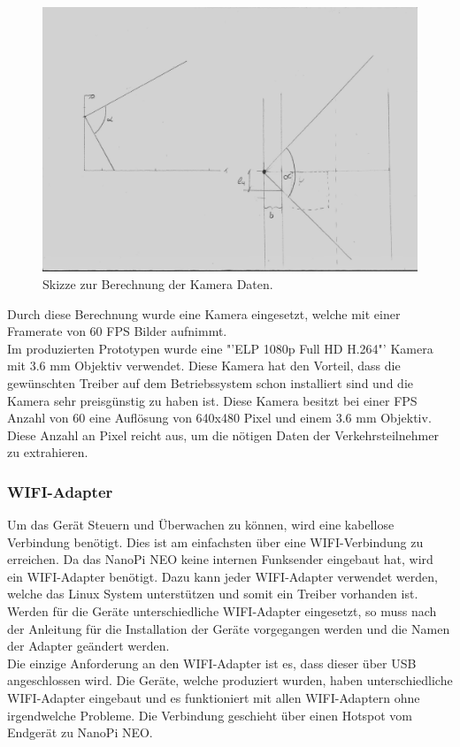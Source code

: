 \begin{figure}[H]
  \centering
  \includegraphics[height=0.49\textwidth]{Hardware/ObjektivBerechnung.jpg} 
  \caption{Skizze zur Berechnung der Kamera Daten.}
  \label{bBerechnung}
\end{figure}

Durch diese Berechnung wurde eine Kamera eingesetzt, welche mit einer Framerate von 60 FPS Bilder aufnimmt. \\
Im produzierten Prototypen wurde eine "'ELP 1080p Full HD H.264"' Kamera mit 3.6 mm Objektiv verwendet. Diese Kamera hat den Vorteil, dass die gewünschten Treiber auf dem Betriebssystem schon installiert sind und die Kamera sehr preisgünstig zu haben ist. Diese Kamera besitzt bei einer FPS Anzahl von 60 eine Auflösung von 640x480 Pixel und einem 3.6 mm Objektiv. Diese Anzahl an Pixel reicht aus, um die nötigen Daten der Verkehrsteilnehmer zu extrahieren. \cite{Kamera}

\subsubsection{WIFI-Adapter}
Um das Gerät Steuern und Überwachen zu können, wird eine kabellose Verbindung benötigt. Dies ist am einfachsten über eine WIFI-Verbindung zu erreichen. Da das NanoPi NEO keine internen Funksender eingebaut hat, wird ein WIFI-Adapter benötigt. Dazu kann jeder WIFI-Adapter verwendet werden, welche das Linux System unterstützen und somit ein Treiber vorhanden ist. Werden für die Geräte unterschiedliche WIFI-Adapter eingesetzt, so muss nach der Anleitung für die Installation der Geräte vorgegangen werden und die Namen der Adapter geändert werden.\\
Die einzige Anforderung an den WIFI-Adapter ist es, dass dieser über USB angeschlossen wird. Die Geräte, welche produziert wurden, haben unterschiedliche WIFI-Adapter eingebaut und es funktioniert mit allen WIFI-Adaptern ohne irgendwelche Probleme. Die Verbindung geschieht über einen Hotspot vom Endgerät zu NanoPi NEO.

